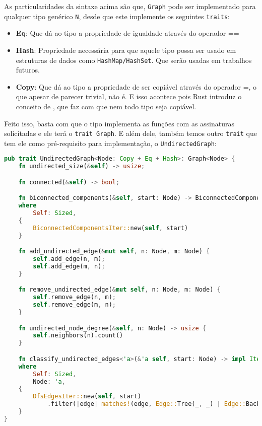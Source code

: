 As particularidades da sintaxe acima são que, \texttt{Graph} pode ser implementado para qualquer tipo genérico \texttt{N}, desde que este implemente os seguintes \texttt{traits}:

\begin{itemize}
  \item \textbf{Eq}: Que dá ao tipo a propriedade de igualdade através do operador ==
  \item \textbf{Hash}: Propriedade necessária para que aquele tipo possa ser usado em estruturas de dados como \texttt{HashMap/HashSet}. Que serão usadas em trabalhos futuros.
  \item \textbf{Copy}: Que dá ao tipo a propriedade de ser copiável através do operador =, o que apesar de parecer trivial, não é. E isso acontece pois Rust introduz o conceito de \cite{ownership}, que faz com que nem todo tipo seja copiável.
\end{itemize}

Feito isso, basta com que o tipo implementa as funções com as assinaturas solicitadas e ele terá o \texttt{trait Graph}. E além dele, também temos outro \texttt{trait} que tem ele como pré-requisito para implementação, o \texttt{UndirectedGraph}:

\begin{lstlisting}[language=Rust, caption={Implementação do trait UndirectedGraph}, label=list:trait_undirected_graph]
pub trait UndirectedGraph<Node: Copy + Eq + Hash>: Graph<Node> {
    fn undirected_size(&self) -> usize;

    fn connected(&self) -> bool;

    fn biconnected_components(&self, start: Node) -> BiconnectedComponentsIter<'_, Node, Self>
    where
        Self: Sized,
    {
        BiconnectedComponentsIter::new(self, start)
    }

    fn add_undirected_edge(&mut self, n: Node, m: Node) {
        self.add_edge(n, m);
        self.add_edge(m, n);
    }

    fn remove_undirected_edge(&mut self, n: Node, m: Node) {
        self.remove_edge(n, m);
        self.remove_edge(m, n);
    }

    fn undirected_node_degree(&self, n: Node) -> usize {
        self.neighbors(n).count()
    }

    fn classify_undirected_edges<'a>(&'a self, start: Node) -> impl Iterator<Item = Edge<Node>>
    where
        Self: Sized,
        Node: 'a,
    {
        DfsEdgesIter::new(self, start)
            .filter(|edge| matches!(edge, Edge::Tree(_, _) | Edge::Back(_, _)))
    }
}
\end{lstlisting}

